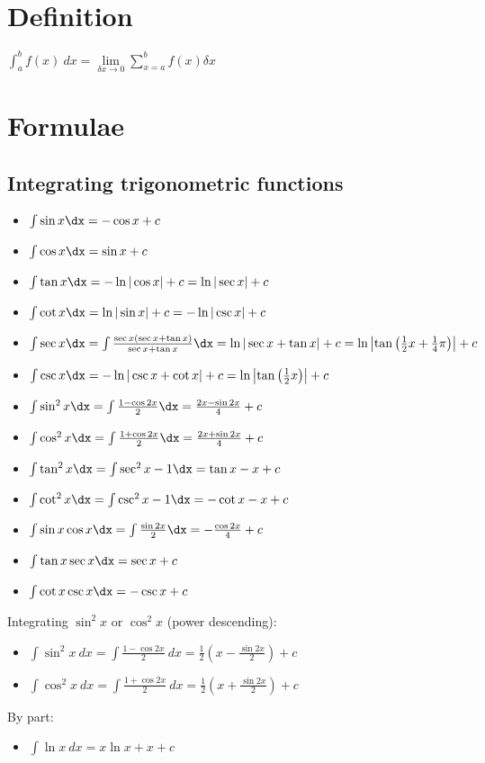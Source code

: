 \section{Definition}
$\int_{a}^{b} f(x) \: dx = \lim\limits_{\delta x\rightarrow0}\sum_{x=a}^{b}f(x)\delta x$

\section{Formulae}
\subsection{Integrating trigonometric functions}
\begin{itemize}
    \item $\int\sin x \dx = -\cos x + c$
    \item $\int\cos x \dx = \sin x + c$
    \item $\int \tan x \dx = -\ln |\cos x| + c= \ln |\sec x| + c$
    \item $\int \cot x \dx = \ln |\sin x| + c = -\ln |\csc x| + c$
    \item $\int \sec x \dx = \int \frac{\sec x(\sec x + \tan x)}{\sec x + \tan x} \dx = \ln |\sec x + \tan x| + c = \ln \left|\tan\left(\frac{1}{2}x+\frac{1}{4}\pi \right)\right| + c$
    \item $\int \csc x \dx = -\ln|\csc x + \cot x| + c = \ln \left|\tan\left(\frac{1}{2}x\right)\right| + c$
    \item $\int \sin^2 x \dx = \int \frac{1-\cos 2x}{2} \dx = \frac{2x-\sin 2x}{4} + c$
    \item $\int \cos^2 x \dx = \int \frac{1+\cos 2x}{2} \dx = \frac{2x+\sin 2x}{4} + c$
    \item $\int \tan^2 x \dx = \int \sec^2 x -1 \dx = \tan x - x + c$
    \item $\int \cot^2 x \dx = \int \csc^2 x -1 \dx = -\cot x - x + c$
    \item $\int \sin x \cos x \dx = \int \frac{\sin 2x}{2} \dx = -\frac{\cos 2x}{4} + c$
    \item $\int \tan x \sec x \dx = \sec x + c$
    \item $\int \cot x \csc x \dx = -\csc x + c$
\end{itemize}
Integrating $\sin^2x$ or $\cos^2x$ (power descending):
\begin{itemize}
    \item $\int \sin ^2 x \: dx=\int \frac{1-\cos 2x}{2} \: dx=\frac{1}{2}\left(x-\frac{\sin 2x}{2}\right)+c$
    \item $\int \cos ^2 x \: dx=\int \frac{1+\cos 2x}{2} \: dx= \frac{1}{2}\left(x+\frac{\sin 2x}{2}\right)+c$
\end{itemize}
By part:
\begin{itemize}
    \item $\int \ln x \: dx = x\ln x + x + c$
\end{itemize}
